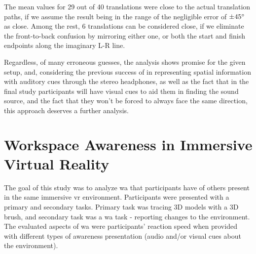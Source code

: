 The mean values for 29 out of 40 translations were close to the actual translation paths, if we assume the result being in the range of the negligible error of $\pm 45\degree$ as close. %
Among the rest, 6 translations can be considered close, if we eliminate the front-to-back confusion by mirroring either one, or both the start and finish endpoints along the imaginary L-R line.

Regardless, of many erroneous guesses, the analysis shows promise for the given setup, and, considering the previous success of \cite{gutwin_chalk_2011} in representing spatial information with auditory cues through the stereo headphones, as well as the fact that in the final study participants will have visual cues to aid them in finding the sound source, and the fact that they won't be forced to always face the same direction, this approach deserves a further analysis.
















\section{Workspace Awareness in Immersive Virtual Reality}
\label{final_study}
The goal of this study was to analyze \gls{wa} that participants have of others present in the same immersive \gls{vr} environment. Participants were presented with a primary and secondary tasks. Primary task was tracing 3D models with a 3D brush, and secondary task was a \gls{wa} task - reporting changes to the environment.
The evaluated aspects of \gls{wa} were participants’ reaction speed when provided with different types of awareness presentation (audio and/or visual cues about the environment).

